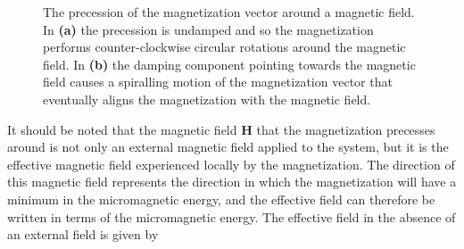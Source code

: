 \begin{figure}[h!]
\begin{subfigure}{.33\textwidth}
  \caption{}
\end{subfigure}
\caption{The precession of the magnetization vector around a magnetic field. In \textbf{(a)} the precession is undamped and so the magnetization performs counter-clockwise circular rotations around the magnetic field. In \textbf{(b)} the damping component pointing towards the magnetic field causes a spiralling motion of the magnetization vector that eventually aligns the magnetization with the magnetic field.}
\label{fig:Precessions}
\end{figure}
It should be noted that the magnetic field $\mathbold{H}$ that the magnetization precesses around is not only an external magnetic field applied to the system, but it is the effective magnetic field experienced locally by the magnetization. The direction of this magnetic field represents the direction in which the magnetization will have a minimum in the micromagnetic energy, and the effective field can therefore be written in terms of the micromagnetic energy. The effective field in the absence of an external field is given by
